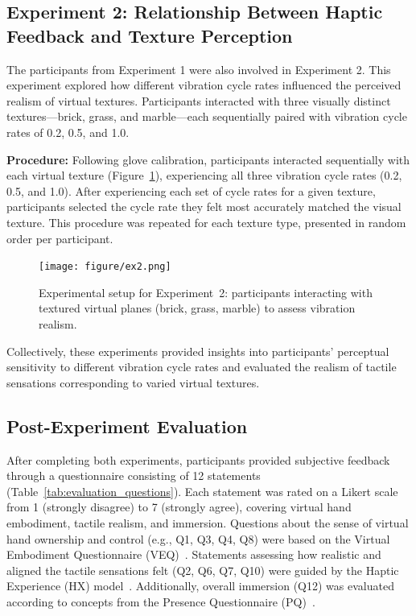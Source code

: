 \documentclass[graybox]{svmult}
\begin{document}
\subsection{Experiment 2: Relationship Between Haptic Feedback and Texture Perception}
The participants from Experiment 1 were also involved in Experiment 2. This experiment explored how different vibration cycle rates influenced the perceived realism of virtual textures. Participants interacted with three visually distinct textures—brick, grass, and marble—each sequentially paired with vibration cycle rates of 0.2, 0.5, and 1.0.

\textbf{Procedure:} Following glove calibration, participants interacted sequentially with each virtual texture (Figure~\ref{fig:experiment2_setup}), experiencing all three vibration cycle rates (0.2, 0.5, and 1.0). After experiencing each set of cycle rates for a given texture, participants selected the cycle rate they felt most accurately matched the visual texture. This procedure was repeated for each texture type, presented in random order per participant.

\begin{figure}\centering
	\texttt{[image: figure/ex2.png]}%
	\caption{Experimental setup for Experiment~2: participants interacting with textured virtual planes (brick, grass, marble) to assess vibration realism.}\label{fig:experiment2_setup}
\end{figure}

Collectively, these experiments provided insights into participants' perceptual sensitivity to different vibration cycle rates and evaluated the realism of tactile sensations corresponding to varied virtual textures.

\subsection{Post-Experiment Evaluation}
After completing both experiments, participants provided subjective feedback through a questionnaire consisting of 12 statements (Table~\ref{tab:evaluation_questions}). Each statement was rated on a Likert scale from 1 (strongly disagree) to 7 (strongly agree), covering virtual hand embodiment, tactile realism, and immersion. Questions about the sense of virtual hand ownership and control (e.g., Q1, Q3, Q4, Q8) were based on the Virtual Embodiment Questionnaire (VEQ)~\cite{roth2018alpha}. Statements assessing how realistic and aligned the tactile sensations felt (Q2, Q6, Q7, Q10) were guided by the Haptic Experience (HX) model~\cite{schneider2017haptic}. Additionally, overall immersion (Q12) was evaluated according to concepts from the Presence Questionnaire (PQ)~\cite{witmer1998measuring}.
\end{document}

